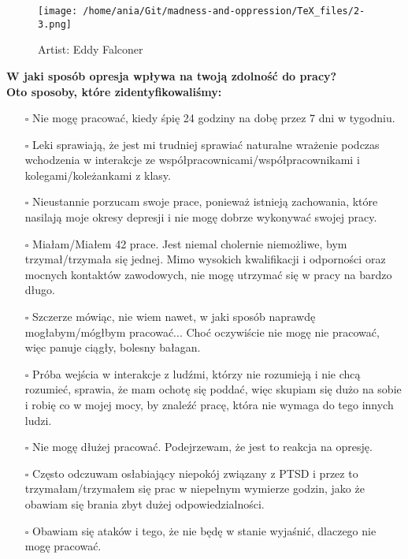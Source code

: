 \newpage
\begin{figure}[h]
\centering
\texttt{[image: /home/ania/Git/madness-and-oppression/TeX\_files/2-3.png]}
\caption{Artist: Eddy Falconer}
\label{2-2}
\end{figure}

\noindent\textcolor{ProcessBlue}{\textbf{\Large{W jaki sposób opresja wpływa na twoją zdolność do pracy?}}}\\
\textbf{\large{Oto sposoby, które zidentyfikowaliśmy:}}
\begin{multicols}{2}
\begin{itemize}
\item[$\square$]{Nie mogę pracować, kiedy śpię 24 godziny na dobę przez 7 dni w tygodniu.}
\item[$\square$]{Leki sprawiają, że jest mi trudniej sprawiać naturalne wrażenie podczas wchodzenia w interakcje ze współpracownicami/współpracownikami i kolegami/koleżankami z klasy.}
\item[$\square$]{Nieustannie porzucam swoje prace, ponieważ istnieją zachowania, które nasilają moje okresy depresji i nie mogę dobrze wykonywać swojej pracy.}
\item[$\square$]{Miałam/Miałem 42 prace. Jest niemal cholernie niemożliwe, bym trzymał/trzymała się jednej. Mimo wysokich kwalifikacji i odporności oraz mocnych kontaktów zawodowych, nie mogę utrzymać się w pracy na bardzo długo.}
\item[$\square$]{Szczerze mówiąc, nie wiem nawet, w jaki sposób naprawdę mogłabym/mógłbym pracować... Choć oczywiście nie mogę nie pracować, więc panuje ciągły, bolesny bałagan.}
\item[$\square$]{Próba wejścia w interakcje z ludźmi, którzy nie rozumieją i nie chcą rozumieć, sprawia, że mam ochotę się poddać, więc skupiam się dużo na sobie i robię co w mojej mocy, by znaleźć pracę, która nie wymaga do tego innych ludzi.}
\item[$\square$]{Nie mogę dłużej pracować. Podejrzewam, że jest to reakcja na opresję.}
\item[$\square$]{Często odczuwam osłabiający niepokój związany z PTSD i przez to trzymałam/trzymałem się prac w niepełnym wymierze godzin, jako że obawiam się brania zbyt dużej odpowiedzialności.}
\item[$\square$]{Obawiam się ataków i tego, że nie będę w stanie wyjaśnić, dlaczego nie mogę pracować.}
\end{itemize}
\end{multicols}


